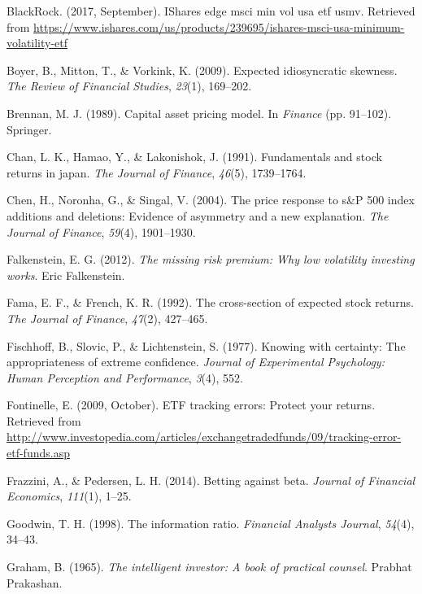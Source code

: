 \documentclass[12pt,twoside]{reedthesis}
\theoremstyle{definition}
\theoremstyle{definition}
\theoremstyle{definition}
\theoremstyle{remark}
\begin{document}
\hypertarget{ref-blackrock2017}{}
BlackRock. (2017, September). IShares edge msci min vol usa etf
\textbar{} usmv. Retrieved from
\url{https://www.ishares.com/us/products/239695/ishares-msci-usa-minimum-volatility-etf}

\hypertarget{ref-boyer2009}{}
Boyer, B., Mitton, T., \& Vorkink, K. (2009). Expected idiosyncratic
skewness. \emph{The Review of Financial Studies}, \emph{23}(1),
169--202.

\hypertarget{ref-brennan1989}{}
Brennan, M. J. (1989). Capital asset pricing model. In \emph{Finance}
(pp. 91--102). Springer.

\hypertarget{ref-chan1991}{}
Chan, L. K., Hamao, Y., \& Lakonishok, J. (1991). Fundamentals and stock
returns in japan. \emph{The Journal of Finance}, \emph{46}(5),
1739--1764.

\hypertarget{ref-chen2004}{}
Chen, H., Noronha, G., \& Singal, V. (2004). The price response to s\&P
500 index additions and deletions: Evidence of asymmetry and a new
explanation. \emph{The Journal of Finance}, \emph{59}(4), 1901--1930.

\hypertarget{ref-falkenstein2012}{}
Falkenstein, E. G. (2012). \emph{The missing risk premium: Why low
volatility investing works}. Eric Falkenstein.

\hypertarget{ref-fama1992}{}
Fama, E. F., \& French, K. R. (1992). The cross-section of expected
stock returns. \emph{The Journal of Finance}, \emph{47}(2), 427--465.

\hypertarget{ref-fischhoff1977}{}
Fischhoff, B., Slovic, P., \& Lichtenstein, S. (1977). Knowing with
certainty: The appropriateness of extreme confidence. \emph{Journal of
Experimental Psychology: Human Perception and Performance}, \emph{3}(4),
552.

\hypertarget{ref-fontinelle2009}{}
Fontinelle, E. (2009, October). ETF tracking errors: Protect your
returns. Retrieved from
\url{http://www.investopedia.com/articles/exchangetradedfunds/09/tracking-error-etf-funds.asp}

\hypertarget{ref-frazzini2014}{}
Frazzini, A., \& Pedersen, L. H. (2014). Betting against beta.
\emph{Journal of Financial Economics}, \emph{111}(1), 1--25.

\hypertarget{ref-goodwin1998}{}
Goodwin, T. H. (1998). The information ratio. \emph{Financial Analysts
Journal}, \emph{54}(4), 34--43.

\hypertarget{ref-graham1965}{}
Graham, B. (1965). \emph{The intelligent investor: A book of practical
counsel}. Prabhat Prakashan.
\end{document}
